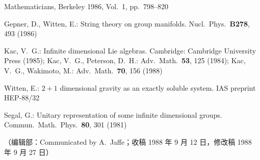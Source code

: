 \documentclass[11pt,a4paper]{article}
\begin{document}
\begin{enumerate}[label={[\arabic*]}, leftmargin=2.4em, labelsep=0.5em, align=left]
          Mathematicians, Berkeley 1986, Vol.~1, pp.~798--820
    \item Gepner, D., Witten, E.: String theory on group manifolds. Nucl.\ Phys.\ \textbf{B278},
          493 (1986)
    \item Kac, V.~G.: Infinite dimensional Lie algebras. Cambridge: Cambridge University Press
          (1985); Kac, V.~G., Peterson, D.~H.: Adv.\ Math.\ \textbf{53}, 125 (1984);
          Kac, V.~G., Wakimoto, M.: Adv.\ Math.\ \textbf{70}, 156 (1988)
    \item Witten, E.: $2+1$ dimensional gravity as an exactly soluble system.
          IAS preprint HEP-88/32
    \item Segal, G.: Unitary representation of some infinite dimensional groups.
          Commun.\ Math.\ Phys.\ \textbf{80}, 301 (1981)
\end{enumerate}
\endgroup

\vspace{1.2em}
\begin{center}
\small
（编辑部：Communicated by A.~Jaffe；收稿 1988 年 9 月 12 日，修改稿 1988 年 9 月 27 日）
\end{center}
\end{document}
